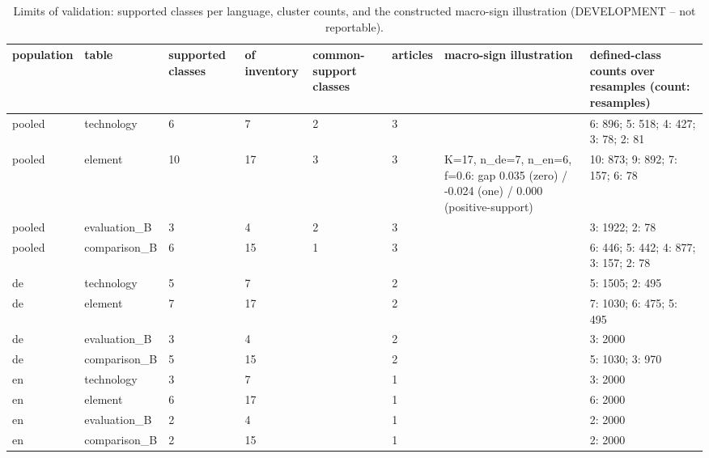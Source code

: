 \begin{table}[htbp]
\centering
\small
\begin{tabular}{llllllll}
\toprule
\textbf{population} & \textbf{table} & \textbf{supported classes} & \textbf{of inventory} & \textbf{common-support classes} & \textbf{articles} & \textbf{macro-sign illustration} & \textbf{defined-class counts over resamples (count: resamples)} \\
\midrule
pooled & technology & 6 & 7 & 2 & 3 &  & 6: 896; 5: 518; 4: 427; 3: 78; 2: 81 \\
pooled & element & 10 & 17 & 3 & 3 & K=17, n\_de=7, n\_en=6, f=0.6: gap 0.035 (zero) / -0.024 (one) / 0.000 (positive-support) & 10: 873; 9: 892; 7: 157; 6: 78 \\
pooled & evaluation\_B & 3 & 4 & 2 & 3 &  & 3: 1922; 2: 78 \\
pooled & comparison\_B & 6 & 15 & 1 & 3 &  & 6: 446; 5: 442; 4: 877; 3: 157; 2: 78 \\
de & technology & 5 & 7 &  & 2 &  & 5: 1505; 2: 495 \\
de & element & 7 & 17 &  & 2 &  & 7: 1030; 6: 475; 5: 495 \\
de & evaluation\_B & 3 & 4 &  & 2 &  & 3: 2000 \\
de & comparison\_B & 5 & 15 &  & 2 &  & 5: 1030; 3: 970 \\
en & technology & 3 & 7 &  & 1 &  & 3: 2000 \\
en & element & 6 & 17 &  & 1 &  & 6: 2000 \\
en & evaluation\_B & 2 & 4 &  & 1 &  & 2: 2000 \\
en & comparison\_B & 2 & 15 &  & 1 &  & 2: 2000 \\
\bottomrule
\end{tabular}
\caption{Limits of validation: supported classes per language, cluster counts, and the constructed macro-sign illustration (DEVELOPMENT -- not reportable).}
\end{table}
